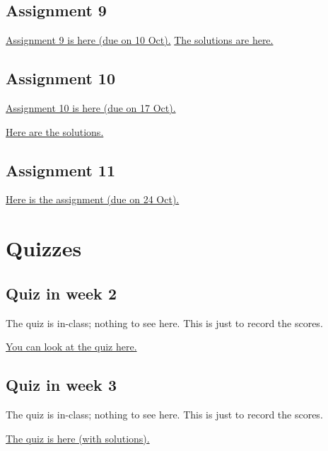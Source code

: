 \documentclass{amsart}
\begin{document}
\subsection{Assignment 9}
\label{sec:orgac20137}
\href{https://canvas.anu.edu.au/files/870410/download?download\_frd=1\&verifier=GbVIq9ttu8I6i7tUyfvcuyJvgOsr7i43v3XtT0QR}{Assignment 9 is here (due on 10 Oct).}
\href{https://canvas.anu.edu.au/files/1253166/download?download\_frd=1\&verifier=78p4RQterGdWob2erusOquWO2sYDrGj1w5AZIWEh}{The solutions are here.}
\subsection{Assignment 10}
\label{sec:org8c712fe}
\href{https://canvas.anu.edu.au/files/1234680/download?download\_frd=1\&verifier=hKdi5heHolUL8ojRUeeI0KvHddX4Kc022QeE9qns}{Assignment 10 is here (due on 17 Oct).}

\href{https://canvas.anu.edu.au/files/1285505/download?download\_frd=1\&verifier=O9uwD0E7kIpYQ7bsqn4zgetOD72FsvOnTQQJopHT}{Here are the solutions.}
\subsection{Assignment 11}
\label{sec:orga87d19f}
\href{https://canvas.anu.edu.au/files/1242935/download?download\_frd=1\&verifier=Ipf81ETJH7KLDTXvtOwAGUQ97ziSgx8r6cMutZM8}{Here is the assignment (due on 24 Oct).}
\section{Quizzes}
\label{sec:orga67b8b0}
\subsection{Quiz in week 2}
\label{sec:orga42d282}
The quiz is in-class; nothing to see here.  This is just to record the scores.

\href{https://canvas.anu.edu.au/files/722147/download?download\_frd=1\&verifier=Mc76QZ7klU5HTpW5UO7QvdOn1eRHnQnNnnF59jUx}{You can look at the quiz here.}
\subsection{Quiz in week 3}
\label{sec:orgfd61b14}
The quiz is in-class; nothing to see here.  This is just to record the scores.

\href{https://canvas.anu.edu.au/files/738771/download?download\_frd=1\&verifier=Saz6eNl3kgVVzGr7SNM8uVwv5w5fYzpVkO7qsIse}{The quiz is here (with solutions).}
\end{document}
